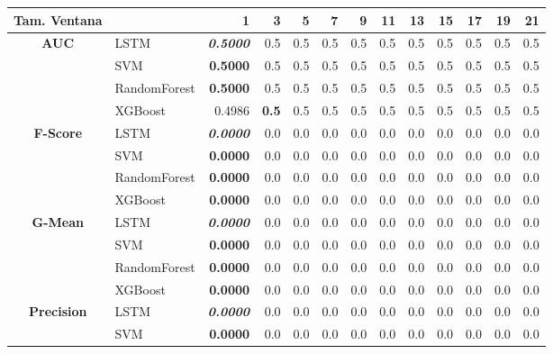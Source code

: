 \begin{table}[H]
	\centering
	\begin{adjustbox}{max width=14cm}
		\begin{tabular}{|c|l|r|r|r|r|r|r|r|r|r|r|r|}
			\hline
			\textbf{Tam. Ventana} &         &      1  &   3  &   5  &   7  &   9  &   11 &   13 &   15 &   17 &   19 &   21 \\
			\hline
			\textbf{AUC} &  LSTM & \textit{ \textbf{  0.5000 } } &  0.5 &  0.5 &  0.5 &  0.5 &  0.5 &  0.5 &  0.5 &  0.5 &  0.5 &  0.5 \\
			&  SVM & \textbf{  0.5000 } &  0.5 &  0.5 &  0.5 &  0.5 &  0.5 &  0.5 &  0.5 &  0.5 &  0.5 &  0.5 \\
			&  RandomForest & \textbf{  0.5000 } &  0.5 &  0.5 &  0.5 &  0.5 &  0.5 &  0.5 &  0.5 &  0.5 &  0.5 &  0.5 \\
			&  XGBoost &  0.4986 & \textbf{  0.5 } &  0.5 &  0.5 &  0.5 &  0.5 &  0.5 &  0.5 &  0.5 &  0.5 &  0.5 \\
			\hline
			\textbf{F-Score} &  LSTM & \textit{ \textbf{  0.0000 } } &  0.0 &  0.0 &  0.0 &  0.0 &  0.0 &  0.0 &  0.0 &  0.0 &  0.0 &  0.0 \\
			&  SVM & \textbf{  0.0000 } &  0.0 &  0.0 &  0.0 &  0.0 &  0.0 &  0.0 &  0.0 &  0.0 &  0.0 &  0.0 \\
			&  RandomForest & \textbf{  0.0000 } &  0.0 &  0.0 &  0.0 &  0.0 &  0.0 &  0.0 &  0.0 &  0.0 &  0.0 &  0.0 \\
			&  XGBoost & \textbf{  0.0000 } &  0.0 &  0.0 &  0.0 &  0.0 &  0.0 &  0.0 &  0.0 &  0.0 &  0.0 &  0.0 \\
			\hline
			\textbf{G-Mean} &  LSTM & \textit{ \textbf{  0.0000 } } &  0.0 &  0.0 &  0.0 &  0.0 &  0.0 &  0.0 &  0.0 &  0.0 &  0.0 &  0.0 \\
			&  SVM & \textbf{  0.0000 } &  0.0 &  0.0 &  0.0 &  0.0 &  0.0 &  0.0 &  0.0 &  0.0 &  0.0 &  0.0 \\
			&  RandomForest & \textbf{  0.0000 } &  0.0 &  0.0 &  0.0 &  0.0 &  0.0 &  0.0 &  0.0 &  0.0 &  0.0 &  0.0 \\
			&  XGBoost & \textbf{  0.0000 } &  0.0 &  0.0 &  0.0 &  0.0 &  0.0 &  0.0 &  0.0 &  0.0 &  0.0 &  0.0 \\ 
			\hline
			\textbf{Precision} &  LSTM & \textit{ \textbf{  0.0000 } } &  0.0 &  0.0 &  0.0 &  0.0 &  0.0 &  0.0 &  0.0 &  0.0 &  0.0 &  0.0 \\
			&  SVM & \textbf{  0.0000 } &  0.0 &  0.0 &  0.0 &  0.0 &  0.0 &  0.0 &  0.0 &  0.0 &  0.0 &  0.0 \\

\end{tabular}
\end{adjustbox}
\end{table}
